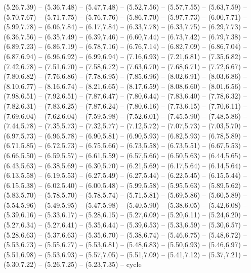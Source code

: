 \expandafter\def\csname geo:gebiet:DE-TH\endcsname{
  (5.26,7.39) -- (5.36,7.48) -- (5.47,7.48) -- (5.52,7.56) -- (5.57,7.55) -- (5.63,7.59) -- (5.70,7.67) -- (5.71,7.75) -- (5.76,7.76) -- (5.86,7.70) -- (5.97,7.73) -- (6.00,7.71) -- (5.99,7.78) -- (6.06,7.84) -- (6.17,7.84) -- (6.33,7.78) -- (6.33,7.75) -- (6.29,7.73) -- (6.36,7.56) -- (6.35,7.49) -- (6.39,7.46) -- (6.60,7.44) -- (6.73,7.42) -- (6.79,7.38) -- (6.89,7.23) -- (6.86,7.19) -- (6.78,7.16) -- (6.76,7.14) -- (6.82,7.09) -- (6.86,7.04) -- (6.87,6.94) -- (6.96,6.92) -- (6.99,6.94) -- (7.16,6.93) -- (7.21,6.81) -- (7.35,6.82) -- (7.42,6.78) -- (7.51,6.70) -- (7.58,6.72) -- (7.63,6.70) -- (7.68,6.71) -- (7.72,6.67) -- (7.80,6.82) -- (7.76,6.86) -- (7.78,6.95) -- (7.85,6.96) -- (8.02,6.91) -- (8.03,6.86) -- (8.10,6.77) -- (8.16,6.74) -- (8.21,6.65) -- (8.17,6.59) -- (8.08,6.60) -- (8.01,6.56) -- (7.98,6.51) -- (7.92,6.51) -- (7.87,6.47) -- (7.80,6.44) -- (7.83,6.40) -- (7.78,6.32) -- (7.82,6.31) -- (7.83,6.25) -- (7.87,6.24) -- (7.80,6.16) -- (7.73,6.15) -- (7.70,6.11) -- (7.69,6.04) -- (7.62,6.04) -- (7.59,5.98) -- (7.52,6.01) -- (7.45,5.90) -- (7.48,5.86) -- (7.44,5.78) -- (7.35,5.73) -- (7.32,5.77) -- (7.12,5.72) -- (7.07,5.73) -- (7.03,5.70) -- (6.97,5.73) -- (6.96,5.78) -- (6.90,5.81) -- (6.90,5.93) -- (6.82,5.93) -- (6.78,5.89) -- (6.71,5.85) -- (6.72,5.73) -- (6.75,5.66) -- (6.73,5.58) -- (6.73,5.51) -- (6.67,5.53) -- (6.66,5.50) -- (6.59,5.57) -- (6.61,5.59) -- (6.57,5.66) -- (6.50,5.63) -- (6.44,5.65) -- (6.43,5.63) -- (6.38,5.69) -- (6.30,5.70) -- (6.21,5.69) -- (6.17,5.64) -- (6.14,5.64) -- (6.13,5.58) -- (6.19,5.53) -- (6.27,5.49) -- (6.27,5.44) -- (6.22,5.45) -- (6.15,5.44) -- (6.15,5.38) -- (6.02,5.40) -- (6.00,5.48) -- (5.99,5.58) -- (5.95,5.63) -- (5.89,5.62) -- (5.83,5.70) -- (5.78,5.70) -- (5.78,5.74) -- (5.71,5.81) -- (5.69,5.86) -- (5.60,5.89) -- (5.54,5.96) -- (5.49,5.95) -- (5.47,5.98) -- (5.40,5.90) -- (5.38,6.05) -- (5.42,6.08) -- (5.39,6.16) -- (5.33,6.17) -- (5.28,6.15) -- (5.27,6.09) -- (5.20,6.11) -- (5.24,6.20) -- (5.27,6.34) -- (5.27,6.41) -- (5.35,6.44) -- (5.39,6.53) -- (5.33,6.59) -- (5.30,6.57) -- (5.28,6.63) -- (5.37,6.63) -- (5.35,6.70) -- (5.38,6.74) -- (5.46,6.75) -- (5.48,6.72) -- (5.53,6.73) -- (5.55,6.77) -- (5.53,6.81) -- (5.48,6.83) -- (5.50,6.93) -- (5.46,6.97) -- (5.51,6.98) -- (5.53,6.93) -- (5.57,7.05) -- (5.51,7.09) -- (5.41,7.12) -- (5.37,7.21) -- (5.30,7.22) -- (5.26,7.25) -- (5.23,7.35) -- cycle}
